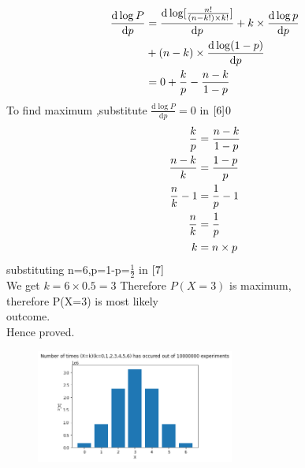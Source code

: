 \documentclass{assignment}
\begin{document}
\begin{multicols}{2}
\begin{align}
\frac{\mathrm{d} \log P}{\mathrm{d} p}&=\frac{\mathrm{d} \log[\frac{n!}{(n-k!)\times k!}]}{\mathrm{d}p}+k\times  \frac{\mathrm{d}\log p}{\mathrm{d} p} \notag \\
     &+(n-k) \times \frac{\mathrm{d}\log (1-p)}{\mathrm{d} p} \notag \\
     &=0+\frac{k}{p}-\frac{n-k}{1-p} \label{6}
\end{align}
To find maximum ,substitute $\frac{\mathrm{d} \log P}{\mathrm{d} p}=0$ in $\eqref{6}$0
\begin{align}
\frac{k}{p}&=\frac{n-k}{1-p} \notag \\
\frac{n-k}{k}&=\frac{1-p}{p} \notag \\
\frac{n}{k}-1&=\frac{1}{p}-1 \notag \\
\frac{n}{k}&=\frac{1}{p} \notag \\
k&=n\times p \label{7}
\end{align}
substituting n=6,p=1-p=$\frac{1}{2}$ in $\eqref{7}$\\
We get $k=6\times 0.5=3$
Therefore $P(X=3)$ is maximum,\\
therefore P(X=3) is most likely \\
outcome.\\
Hence proved.
\end{multicols}
\begin{figure}
\begin{center}
\includegraphics[width=0.58\textwidth]{assignment1.png}
\end{center}
\end{figure}
\end{document}
